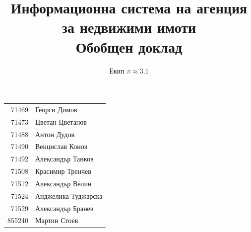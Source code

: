 \documentclass[a4paper]{article}
\begin{document}
\title{Информационна система на агенция за недвижими имоти\\Обобщен доклад}
\author{Екип $\pi \approx 3.1$}

\maketitle

\begin{center}

\begin{tabular}{r|l}
71469	& Георги Димов \\ %
71473	& Цветан Цветанов \\ %
71488	& Антон Дудов \\ %
71490	& Венцислав Конов \\ %
71492	& Александър Танков \\ %
71508	& Красимир Тренчев \\ %
71512	& Александър Велин \\ %
71524	& Анджелика Туджарска \\ %
71529	& Александър Бранев \\ %
855240	& Мартин Стоев \\ %
\end{tabular}

\end{center}

\clearpage

\tableofcontents

\clearpage
\end{document}
